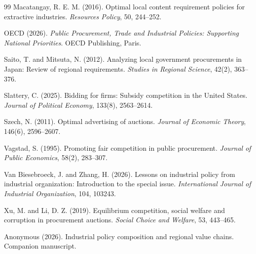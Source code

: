 \begin{thebibliography}{99}
Macatangay, R. E. M. (2016).
Optimal local content requirement policies for extractive industries.
\emph{Resources Policy}, 50, 244--252.

OECD (2026).
\emph{Public Procurement, Trade and Industrial Policies: Supporting National Priorities}.
OECD Publishing, Paris.

Saito, T. and Mitsuta, N. (2012).
Analyzing local government procurements in Japan: Review of regional requirements.
\emph{Studies in Regional Science}, 42(2), 363--376.

Slattery, C. (2025).
Bidding for firms: Subsidy competition in the United States.
\emph{Journal of Political Economy}, 133(8), 2563--2614.

Szech, N. (2011).
Optimal advertising of auctions.
\emph{Journal of Economic Theory}, 146(6), 2596--2607.

Vagstad, S. (1995).
Promoting fair competition in public procurement.
\emph{Journal of Public Economics}, 58(2), 283--307.

Van Biesebroeck, J. and Zhang, H. (2026).
Lessons on industrial policy from industrial organization: Introduction to the special issue.
\emph{International Journal of Industrial Organization}, 104, 103243.

Xu, M. and Li, D. Z. (2019).
Equilibrium competition, social welfare and corruption in procurement auctions.
\emph{Social Choice and Welfare}, 53, 443--465.

Anonymous (2026).
Industrial policy composition and regional value chains.
Companion manuscript.

\end{thebibliography}
